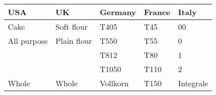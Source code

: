 \begin{tabular}{@{}lllll@{}}
\toprule
\textbf{USA}  & \textbf{UK}  & {\textbf{Germany}} & {\textbf{France}} & {\textbf{Italy}} \\ \midrule
Cake         & Soft flour  &  T405    &  T45   & 00 \\ 
All purpose  & Plain flour &  T550    &  T55   &  0 \\ 
             &             &  T812    &  T80   &  1 \\ 
             &             & T1050    & T110   &  2 \\ 
Whole        & Whole       & Vollkorn & T150   & Integrale \\ \bottomrule
\end{tabular}
